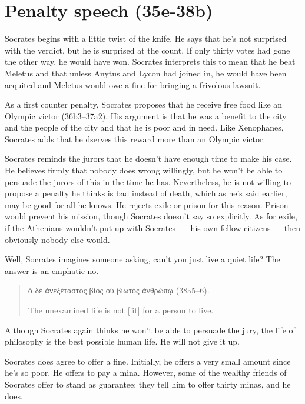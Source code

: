 \documentclass[11pt]{article}
\begin{document}

\section{Penalty speech (35e-38b)}

Socrates begins with a little twist of the knife.  He says that he's not surprised with the verdict, but he is surprised at the count. If only thirty votes had gone the other way, he would have won.  Socrates interprets this to mean that he beat Meletus and that unless Anytus and Lycon had joined in, he would have been acquited and Meletus would owe a fine for bringing a frivolous lawsuit.

As a first counter penalty, Socrates proposes that he receive free food like an Olympic victor (36b3--37a2).  His argument is that he was a benefit to the city and the people of the city and that he is poor and in need.  Like Xenophanes, Socrates adds that he dserves this reward more than an Olympic victor.

Socrates reminds the jurors that he doesn't have enough time to make his case.  He believes firmly that nobody does wrong willingly, but he won't be able to persuade the jurors of this in the time he has.  Nevertheless, he is not willing to propose a penalty he thinks is bad instead of death, which as he's said earlier, may be good for all he knows.  He rejects exile or prison for this reason.  Prison would prevent his mission, though Socrates doesn't say so explicitly.  As for exile, if the Athenians wouldn't put up with Socrates~--- his own fellow citizens --- then obviously nobody else would.

Well, Socrates imagines someone asking, can't you just live a quiet life?  The answer is an emphatic no.

\begin{quote}
    ὁ δὲ ἀνεξέταστος βίος οὐ βιωτὸς ἀνθρώπῳ (38a5--6).

    The unexamined life is not [fit] for a person to live.
\end{quote}

Although Socrates again thinks he won't be able to persuade the jury, the life of philosophy is the best possible human life.  He will not give it up.

Socrates does agree to offer a fine.  Initially, he offers a very small amount since he's so poor.  He offers to pay a mina.  However, some of the wealthy friends of Socrates offer to stand as guarantee: they tell him to offer thirty minas, and he does.


\newpage


\end{document}
